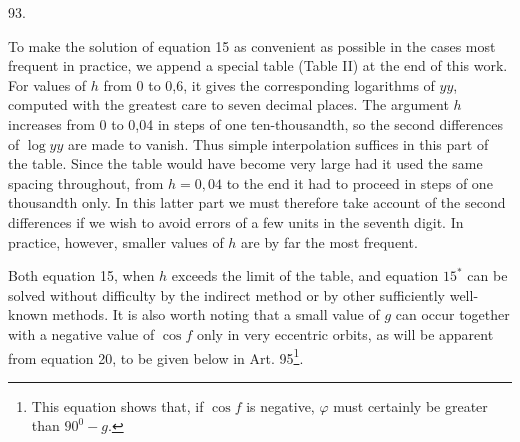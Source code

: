 \par{}\medskip
\hypertarget{native-126-article093}{}
\begin{center}93.\end{center}
To make the solution of equation 15 as convenient as possible in the cases most frequent in practice, we append a special table (Table II) at the end of this work. For values of $h$ from 0 to 0,6, it gives the corresponding logarithms of $yy$, computed with the greatest care to seven decimal places. The argument $h$ increases from 0 to 0,04 in steps of one ten-thousandth, so the second differences of $\log yy$ are made to vanish. Thus simple interpolation suffices in this part of the table. Since the table would have become very large had it used the same spacing throughout, from $h=0{,}04$ to the end it had to proceed in steps of one thousandth only. In this latter part we must therefore take account of the second differences if we wish to avoid errors of a few units in the seventh digit. In practice, however, smaller values of $h$ are by far the most frequent.

Both equation 15, when $h$ exceeds the limit of the table, and equation $15^{\ast}$ can be solved without difficulty by the indirect method or by other sufficiently well-known methods. It is also worth noting that a small value of $g$ can occur together with a negative value of $\cos f$ only in very eccentric orbits, as will be apparent from equation 20, to be given below in Art. 95\footnote{This equation shows that, if $\cos f$ is negative, $\varphi$ must certainly be greater than $90^0-g$.}.
